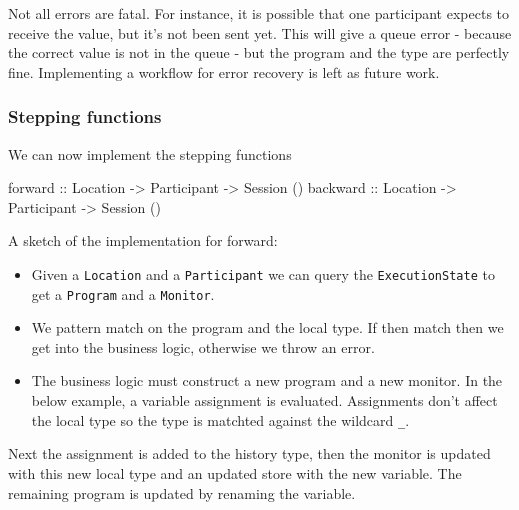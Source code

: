 \documentclass[runningheads]{llncs}
\providecommand{\tightlist}{%
  \setlength{\itemsep}{0pt}\setlength{\parskip}{0pt}}
\newenvironment{Shaded}{}{}
\newcommand{\DataTypeTok}[1]{\textcolor[rgb]{0.56,0.13,0.00}{#1}}
\newcommand{\OtherTok}[1]{\textcolor[rgb]{0.00,0.44,0.13}{#1}}
\newcommand{\NormalTok}[1]{#1}
\begin{document}
Not all errors are fatal. For instance, it is possible that one
participant expects to receive the value, but it's not been sent yet.
This will give a queue error - because the correct value is not in the
queue - but the program and the type are perfectly fine. Implementing a
workflow for error recovery is left as future work.

\subsubsection{Stepping functions}\label{stepping-functions}

We can now implement the stepping functions

\begin{Shaded}
\begin{Highlighting}[]
\OtherTok{forward ::} \DataTypeTok{Location} \OtherTok{->} \DataTypeTok{Participant} \OtherTok{->} \DataTypeTok{Session}\NormalTok{ ()}
\OtherTok{backward ::} \DataTypeTok{Location} \OtherTok{->} \DataTypeTok{Participant} \OtherTok{->} \DataTypeTok{Session}\NormalTok{ ()}
\end{Highlighting}
\end{Shaded}

A sketch of the implementation for forward:

\begin{itemize}
\tightlist
\item
  Given a \texttt{Location} and a \texttt{Participant} we can query the
  \texttt{ExecutionState} to get a \texttt{Program} and a
  \texttt{Monitor}.
\item
  We pattern match on the program and the local type. If then match then
  we get into the business logic, otherwise we throw an error.
\item
  The business logic must construct a new program and a new monitor. In
  the below example, a variable assignment is evaluated. Assignments
  don't affect the local type so the type is matchted against the
  wildcard \texttt{\_}.
\end{itemize}

Next the assignment is added to the history type, then the monitor is
updated with this new local type and an updated store with the new
variable. The remaining program is updated by renaming the variable.
\end{document}

